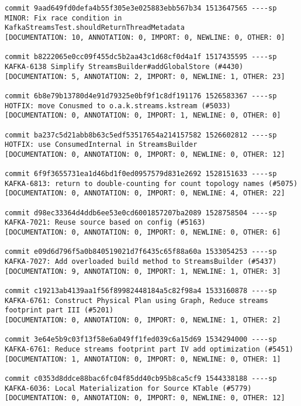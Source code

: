 \begin{lstlisting}
commit 9aad649fd0defa4b55f305e3e025883ebb567b34 1513647565 ----sp
MINOR: Fix race condition in KafkaStreamsTest.shouldReturnThreadMetadata                            
[DOCUMENTATION: 10, ANNOTATION: 0, IMPORT: 0, NEWLINE: 0, OTHER: 0]

commit b8222065e0cc09f455dc5b2aa43c1d68cf0d4a1f 1517435595 ----sp
KAFKA-6138 Simplify StreamsBuilder#addGlobalStore (#4430)                                           
[DOCUMENTATION: 5, ANNOTATION: 2, IMPORT: 0, NEWLINE: 1, OTHER: 23]

commit 6b8e79b13780d4e91d79325e0bf9f1c8df191176 1526583367 ----sp
HOTFIX: move Conusmed to o.a.k.streams.kstream (#5033)                                              
[DOCUMENTATION: 0, ANNOTATION: 0, IMPORT: 1, NEWLINE: 0, OTHER: 0]

commit ba237c5d21abb8b63c5edf53517654a214157582 1526602812 ----sp
HOTFIX: use ConsumedInternal in StreamsBuilder                                                      
[DOCUMENTATION: 0, ANNOTATION: 0, IMPORT: 0, NEWLINE: 0, OTHER: 12]

commit 6f9f3655731ea1d46bd1f0ed0957579d831e2692 1528151633 ----sp
KAFKA-6813: return to double-counting for count topology names (#5075)                              
[DOCUMENTATION: 0, ANNOTATION: 0, IMPORT: 0, NEWLINE: 4, OTHER: 22]

commit d98ec33364d4ddb6ee53e0cd6001857207ba2089 1528758504 ----sp
KAFKA-7021: Reuse source based on config (#5163)                                                    
[DOCUMENTATION: 0, ANNOTATION: 0, IMPORT: 0, NEWLINE: 0, OTHER: 6]

commit e09d6d796f5a0b840519021d7f6435c65f88a60a 1533054253 ----sp
KAFKA-7027: Add overloaded build method to StreamsBuilder (#5437)                                   
[DOCUMENTATION: 9, ANNOTATION: 0, IMPORT: 1, NEWLINE: 1, OTHER: 3]

commit c19213ab4139aa1f56f89982448184a5c82f98a4 1533160878 ----sp
KAFKA-6761: Construct Physical Plan using Graph, Reduce streams footprint part III (#5201)          
[DOCUMENTATION: 0, ANNOTATION: 0, IMPORT: 0, NEWLINE: 1, OTHER: 2]

commit 3e64e5b9c03f13f58e6a049ff1fed039c6a15d69 1534294000 ----sp
KAFKA-6761: Reduce streams footprint part IV add optimization (#5451)                               
[DOCUMENTATION: 1, ANNOTATION: 0, IMPORT: 0, NEWLINE: 0, OTHER: 1]

commit c0353d8ddce88bac6fc04f85dd40cb95b8ca5cf9 1544338188 ----sp
KAFKA-6036: Local Materialization for Source KTable (#5779)                                         
[DOCUMENTATION: 0, ANNOTATION: 0, IMPORT: 0, NEWLINE: 0, OTHER: 12]


\end{lstlisting}
